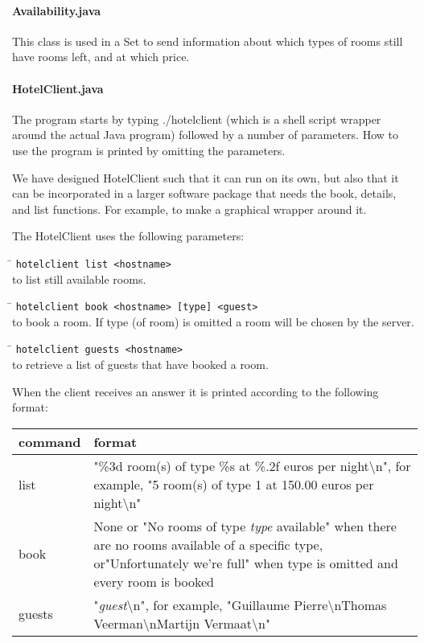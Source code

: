 \documentclass[a4paper,10pt]{article}
\begin{document}
\paragraph{Availability.java}
This class is used in a Set to send information about which types of rooms still have rooms left, and at which price.

\paragraph{HotelClient.java}
The program starts by typing ./hotelclient (which is a shell script wrapper around the actual Java program) followed by a number of parameters. How to use the program is printed by omitting the parameters.

We have designed HotelClient such that it can run on its own, but also that it can be incorporated in a larger software package that needs the book, details, and list functions. For example, to make a graphical wrapper around it.

The HotelClient uses the following parameters:

\begin{tabbing}
\hspace{20pt}\=\kill
 \> \texttt{hotelclient list <hostname>} \\
 \> to list still available rooms.
\end{tabbing}

\begin{tabbing}
\hspace{20pt}\=\kill
 \> \texttt{hotelclient book <hostname> [type] <guest>} \\
 \> to book a room. If type (of room) is omitted a room will be chosen by the server.
\end{tabbing}

\begin{tabbing}
\hspace{20pt}\=\kill
 \> \texttt{hotelclient guests <hostname>} \\
 \> to retrieve a list of guests that have booked a room.
\end{tabbing}

When the client receives an answer it is printed according to the following format:

\begin{center}
\begin{tabular}{ l | p{9.3cm} }
\textbf{command} & \textbf{format}\\ \hline
list & "\%3d room(s) of type \%s at \%.2f euros per night\textbackslash n", for example, "5 room(s) of type 1 at 150.00 euros per night\textbackslash n"\\ \hline
book & None or "No rooms of type \emph{type} available" when there are no rooms available of a specific type, or"Unfortunately we're full" when type is omitted and every room is booked \\ \hline
guests & "\emph{guest}\textbackslash n", for example, "Guillaume Pierre\textbackslash nThomas Veerman\textbackslash nMartijn Vermaat\textbackslash n" \\
\end{tabular}
\end{center}
\end{document}
